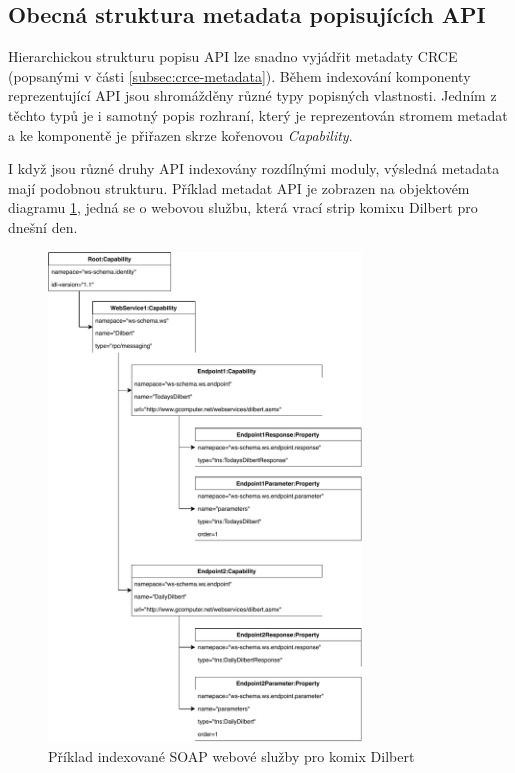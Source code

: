 \documentclass[czech,DP]{thesiskiv}
\begin{document}
\subsection{Obecná struktura metadata popisujících API}

Hierarchickou strukturu popisu API lze snadno vyjádřit metadaty CRCE (popsanými v části \ref{subsec:crce-metadata}). Během indexování komponenty reprezentující API jsou shromážděny různé typy popisných vlastnosti. Jedním z těchto typů je i samotný popis rozhraní, který je reprezentován stromem metadat a ke komponentě je přiřazen skrze  kořenovou \textit{Capability}.   

I když jsou různé druhy API indexovány rozdílnými moduly, výsledná metadata mají podobnou strukturu. Příklad metadat API je zobrazen na objektovém diagramu \ref{fig:indexed-api-example}, jedná se o webovou službu, která vrací strip komixu Dilbert pro dnešní den.


 \begin{figure}[h]
	\centering
	\includegraphics[height=13cm]{indexed-api-example}
	\caption{Příklad indexované SOAP webové služby pro komix Dilbert }
	\label{fig:indexed-api-example}
\end{figure}
\end{document}
